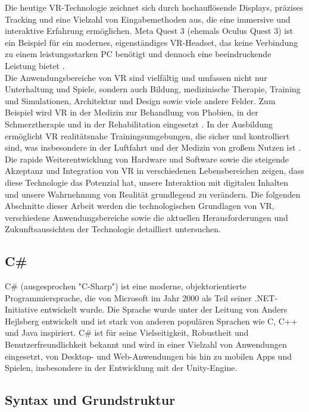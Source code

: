 \noindent
Die heutige VR-Technologie zeichnet sich durch hochauflösende Displays, präzises Tracking und eine Vielzahl von Eingabemethoden aus, die eine immersive und interaktive Erfahrung ermöglichen. Meta Quest 3 (ehemals Oculus Quest 3) ist ein Beispiel für ein modernes, eigenständiges VR-Headset, das keine Verbindung zu einem leistungsstarken PC benötigt und dennoch eine beeindruckende Leistung bietet \cite{meta2023}.
\\

\noindent
Die Anwendungsbereiche von VR sind vielfältig und umfassen nicht nur Unterhaltung und Spiele, sondern auch Bildung, medizinische Therapie, Training und Simulationen, Architektur und Design sowie viele andere Felder. Zum Beispiel wird VR in der Medizin zur Behandlung von Phobien, in der Schmerztherapie und in der Rehabilitation eingesetzt \cite{rizzo2017}. In der Ausbildung ermöglicht VR realitätsnahe Trainingsumgebungen, die sicher und kontrolliert sind, was insbesondere in der Luftfahrt und der Medizin von großem Nutzen ist \cite{huang2018}.
\\

\noindent
Die rapide Weiterentwicklung von Hardware und Software sowie die steigende Akzeptanz und Integration von VR in verschiedenen Lebensbereichen zeigen, dass diese Technologie das Potenzial hat, unsere Interaktion mit digitalen Inhalten und unsere Wahrnehmung von Realität grundlegend zu verändern. Die folgenden Abschnitte dieser Arbeit werden die technologischen Grundlagen von VR, verschiedene Anwendungsbereiche sowie die aktuellen Herausforderungen und Zukunftsaussichten der Technologie detailliert untersuchen.

\subsection{C\#}
C\# (ausgesprochen "C-Sharp") ist eine moderne, objektorientierte Programmiersprache, die von Microsoft im Jahr 2000 als Teil seiner .NET-Initiative entwickelt wurde. Die Sprache wurde unter der Leitung von Anders Hejlsberg entwickelt und ist stark von anderen populären Sprachen wie C, C++ und Java inspiriert. C\# ist für seine Vielseitigkeit, Robustheit und Benutzerfreundlichkeit bekannt und wird in einer Vielzahl von Anwendungen eingesetzt, von Desktop- und Web-Anwendungen bis hin zu mobilen Apps und Spielen, insbesondere in der Entwicklung mit der Unity-Engine.

\subsection{Syntax und Grundstruktur}

